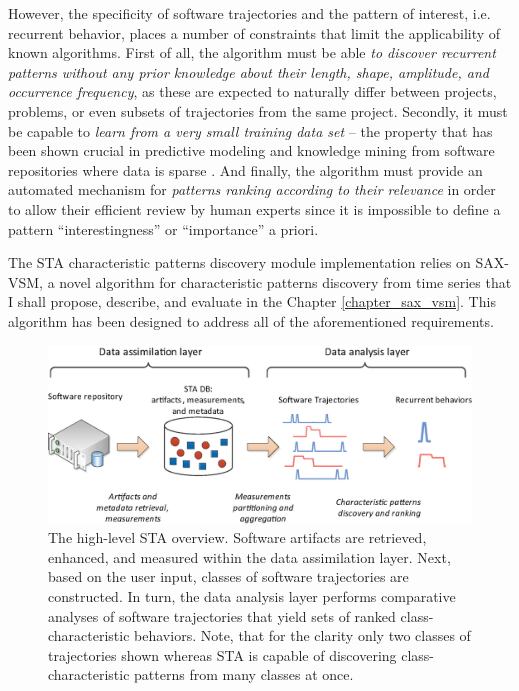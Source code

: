 However, the specificity of software trajectories and the pattern of interest, i.e. recurrent behavior, 
places a number of constraints that limit the applicability of known algorithms.
First of all, the algorithm must be able \textit{to discover recurrent patterns without any prior knowledge 
about their length, shape, amplitude, and occurrence frequency}, as these are expected to naturally differ 
between projects, problems, or even subsets of trajectories from the same project.
Secondly, it must be capable to \textit{learn from a very small training data set} --
the property that has been shown crucial in predictive modeling and knowledge mining from software 
repositories where data is sparse \cite{citeulike:6055293}.
And finally, the algorithm must provide an automated mechanism for 
\textit{patterns ranking according to their relevance} in order to allow their efficient 
review by human experts since it is impossible to define a pattern ``interestingness'' or 
``importance'' a priori.

The STA characteristic patterns discovery module implementation relies on SAX-VSM,
a novel algorithm for characteristic patterns discovery from time series that I shall propose, describe, and evaluate 
in the Chapter \ref{chapter_sax_vsm}. 
This algorithm has been designed to address all of the aforementioned requirements.

\begin{figure}[t]
   \centering
   \includegraphics[width=150mm]{figures/Flow-analysis.eps}
   \caption{The high-level STA overview. Software artifacts are retrieved, enhanced, and measured within the
   data assimilation layer. Next, based on the user input, classes of software trajectories are constructed.   
   In turn, the data analysis layer performs comparative analyses of software trajectories that yield sets
   of ranked class-characteristic behaviors.
   Note, that for the clarity only two classes of trajectories shown whereas STA is capable of discovering
   class-characteristic patterns from many classes at once.}
   \label{fig:sta-full-overview}
\end{figure}

